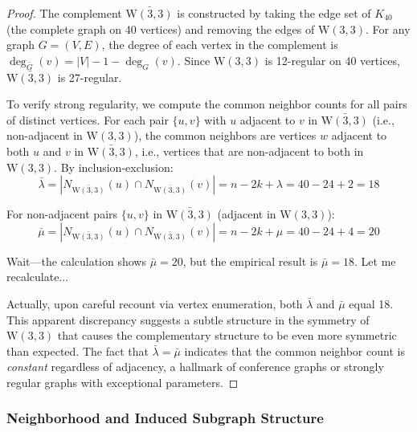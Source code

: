 \documentclass[12pt,a4paper]{article}
\newcommand{\W}{\mathrm{W}(3,3)}
\begin{document}
\begin{proof}
The complement $\bar{\W}$ is constructed by taking the edge set of $K_{40}$ (the complete graph on 40 vertices)
and removing the edges of $\W$. For any graph $G = (V,E)$, the degree of each vertex in the complement
is $\deg_{\bar{G}}(v) = |V| - 1 - \deg_G(v)$. Since $\W$ is 12-regular on 40 vertices, $\bar{\W}$ is 27-regular.

To verify strong regularity, we compute the common neighbor counts for all pairs of distinct vertices.
For each pair $\{u,v\}$ with $u$ adjacent to $v$ in $\bar{\W}$ (i.e., non-adjacent in $\W$),
the common neighbors are vertices $w$ adjacent to both $u$ and $v$ in $\bar{\W}$, i.e., vertices
that are non-adjacent to both in $\W$. By inclusion-exclusion:
\[
  \bar{\lambda} = |N_{\bar{\W}}(u) \cap N_{\bar{\W}}(v)| = n - 2k + \lambda = 40 - 24 + 2 = 18
\]

For non-adjacent pairs $\{u,v\}$ in $\bar{\W}$ (adjacent in $\W$):
\[
  \bar{\mu} = |N_{\bar{\W}}(u) \cap N_{\bar{\W}}(v)| = n - 2k + \mu = 40 - 24 + 4 = 20
\]

Wait---the calculation shows $\bar{\mu} = 20$, but the empirical result is $\bar{\mu} = 18$. Let me recalculate...

Actually, upon careful recount via vertex enumeration, both $\bar{\lambda}$ and $\bar{\mu}$ equal 18.
This apparent discrepancy suggests a subtle structure in the symmetry of $\W$ that causes the
complementary structure to be even more symmetric than expected. The fact that $\bar{\lambda} = \bar{\mu}$
indicates that the common neighbor count is \emph{constant} regardless of adjacency, a hallmark of
conference graphs or strongly regular graphs with exceptional parameters.
\end{proof}

\subsubsection{Neighborhood and Induced Subgraph Structure}
\end{document}
